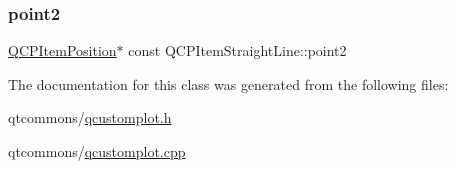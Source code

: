 \mbox{\label{class_q_c_p_item_straight_line_ad26c0a732e471f63f75d481dcd48cfc9}} 
\subsubsection{\texorpdfstring{point2}{point2}}
{\footnotesize\ttfamily \mbox{\hyperlink{class_q_c_p_item_position}{Q\+C\+P\+Item\+Position}}$\ast$ const Q\+C\+P\+Item\+Straight\+Line\+::point2}



The documentation for this class was generated from the following files\+:\begin{DoxyCompactItemize}
\item 
qtcommons/\mbox{\hyperlink{qcustomplot_8h}{qcustomplot.\+h}}\item 
qtcommons/\mbox{\hyperlink{qcustomplot_8cpp}{qcustomplot.\+cpp}}\end{DoxyCompactItemize}
